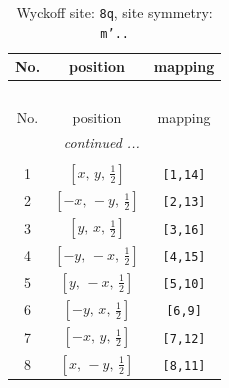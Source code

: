 \documentclass[fleqn,8pt]{jsarticle}
\begin{document}
\begin{longtable}{ccc}
\caption{Wyckoff site: {\tt 8q}, site symmetry: {\tt m'..}}
 \\
 \hline \hline
No. & position & mapping \\ \hline \endfirsthead

\multicolumn{2}{l}{\tablename\ \thetable{}} \\
 \hline \hline
No. & position & mapping \\ \hline \endhead

 \hline \hline
\multicolumn{2}{r}{\footnotesize\it continued ...} \\ \endfoot

 \hline \hline
\multicolumn{2}{r}{} \\ \endlastfoot

1 & $\left[ x,\, y,\, \frac{1}{2} \right]$ & {\tt [1,14]} \\ \hline
2 & $\left[ - x,\, - y,\, \frac{1}{2} \right]$ & {\tt [2,13]} \\ \hline
3 & $\left[ y,\, x,\, \frac{1}{2} \right]$ & {\tt [3,16]} \\ \hline
4 & $\left[ - y,\, - x,\, \frac{1}{2} \right]$ & {\tt [4,15]} \\ \hline
5 & $\left[ y,\, - x,\, \frac{1}{2} \right]$ & {\tt [5,10]} \\ \hline
6 & $\left[ - y,\, x,\, \frac{1}{2} \right]$ & {\tt [6,9]} \\ \hline
7 & $\left[ - x,\, y,\, \frac{1}{2} \right]$ & {\tt [7,12]} \\ \hline
8 & $\left[ x,\, - y,\, \frac{1}{2} \right]$ & {\tt [8,11]} \\
\end{longtable}
\renewcommand{\arraystretch}{1.2}
\end{document}
